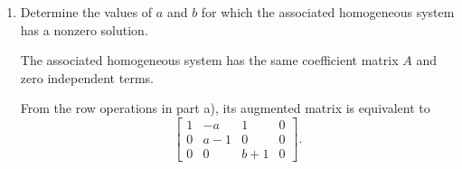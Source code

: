 \begin{enumerate}[label=\alph*)]
\begin{answer}
    Since $b+1\neq0$,
    $$
    r(A)=2<3=r([A\mid B]).
    $$

    The system is inconsistent.

    \textbf{Case 2: $a=1$, $b=-1$}

    $$
    \left[
    \begin{array}{ccc|c}
    1&-1&1&1\\
    0&0&0&1\\
    0&0&0&0
    \end{array}
    \right]
    $$

    $$
    r(A)=1<2=r([A\mid B]).
    $$

    The system is inconsistent.

    \textbf{Case 3: $a\neq1$, $b=-1$}

    $$
    \left[
    \begin{array}{ccc|c}
    1&-a&1&1\\
    0&a-1&0&1\\
    0&0&0&0
    \end{array}
    \right]
    $$

    $$
    r(A)=r([A\mid B])=2<3.
    $$

    The system is consistent and
    indeterminate, with degree
    $$
    p=3-2=1.
    $$

    \textbf{Case 4: $a\neq1$, $b\neq-1$}

    All three pivot positions
    are nonzero. Hence
    $$
    r(A)=r([A\mid B])=3=n.
    $$

    The system is consistent
    and determined.

    \textbf{Conclusion}

    $$
    \boxed{
    \begin{array}{ll}
    a=1:
    &\text{inconsistent},\\
    a\neq1,\ b=-1:
    &\text{consistent indeterminate, degree }1,\\
    a\neq1,\ b\neq-1:
    &\text{consistent determined}.
    \end{array}
    }
    $$
\end{answer}

\item Determine the values of $a$
and $b$ for which the associated
homogeneous system has a nonzero solution.

\begin{answer}
    The associated homogeneous system has the same coefficient matrix $A$ and zero independent terms.

    From the row operations in part a), its augmented matrix is equivalent to
    $$
    \left[
    \begin{array}{ccc|c}
    1&-a&1&0\\
    0&a-1&0&0\\
    0&0&b+1&0
    \end{array}
    \right].
    $$


\end{answer}
\end{enumerate}
